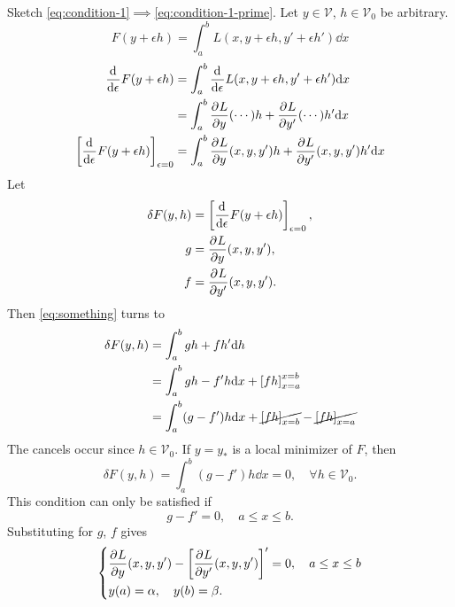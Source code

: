 \documentclass[12pt,twoside]{article}
\begin{document}
Sketch \cref{eq:condition-1}$\implies$\cref{eq:condition-1-prime}. Let
$y\in\mathcal{V}$, $h\in\mathcal{V}_0$ be arbitrary.
$$F(y+\epsilon h)=\int_a^bL(x,y+\epsilon h,y'+\epsilon h')\dd{x}$$
\begin{equation}
  \label{eq:something}
  \begin{aligned}
    \frac{\mathrm{d}^{} {}}{\mathrm{d}{\epsilon}^{}}F(y+\epsilon h)&=\int_a^b\frac{\mathrm{d}^{} {}}{\mathrm{d}{\epsilon}^{}}L(x,y+\epsilon h,y'+\epsilon h')\mathrm{d}{x} \\
    &= \int_a^b\frac{\partial^{} {L}}{\partial {y}^{}}(\cdots)h + \frac{\partial^{} {L}}{\partial {y'}^{}}(\cdots)h' \mathrm{d}{x} \\
    \left[\frac{\mathrm{d}^{} {}}{\mathrm{d}{\epsilon}^{}}F(y+\epsilon h)\right]_{\epsilon=0}&=
    \int_a^b\frac{\partial^{} {L}}{\partial {y}^{}}(x,y,y')h+\frac{\partial^{} {L}}{\partial {y'}^{}}(x,y,y')h'\mathrm{d}{x} \\
  \end{aligned}
\end{equation}
Let
\begin{align*}
  \delta F(y,h) &= \left[\frac{\mathrm{d}^{} {}}{\mathrm{d}{\epsilon}^{}}F(y+\epsilon h)\right]_{\epsilon=0},\\
  g &= \frac{\partial^{} {L}}{\partial {y}^{}}(x,y,y'), \\
  f &= \frac{\partial^{} {L}}{\partial {y'}^{}}(x,y,y'). \\
\end{align*}
Then \cref{eq:something} turns to
\begin{equation*}
  \begin{aligned}
    \delta F(y,h) &= \int_a^b gh + fh' \mathrm{d}{h} \\
    &= \int_a^b gh - f'h\mathrm{d}{x} + \left[ fh \right]_{x=a}^{x=b} \\
    &= \int_a^b (g-f')h\mathrm{d}{x}+ \cancel{\left[ fh \right]_{x=b}} - \cancel{\left[ fh \right]_{x=a}}
  \end{aligned}
\end{equation*}
The cancels occur since $h\in\mathcal{V}_0$. If $y=y_*$ is a local minimizer of
$F$, then
\begin{equation*}
  \delta F(y,h) = \int_a^b (g-f')h \dd{x}=0,\quad \forall h\in\mathcal{V}_0.
\end{equation*}
This condition can only be satisfied if $$g-f'=0,\quad a\le x \le b.$$
Substituting for $g$, $f$ gives
\begin{equation*} \left\{
  \begin{aligned}
    &\frac{\partial^{} {L}}{\partial {y}^{}}(x,y,y') - \left[ \frac{\partial^{} {L}}{\partial {y'}^{}}(x,y,y') \right]'=0,\quad a\le x \le b \\
    &y(a)=\alpha,\quad y(b)=\beta.
  \end{aligned} \right.
\end{equation*}
\end{document}
